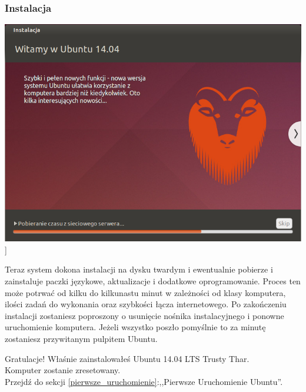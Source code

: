 \subsubsection{Instalacja}
\begin{center}
        \includegraphics[width=\linewidth]{images/instalator_kopiowanie.png}]
\end{center}

Teraz system dokona instalacji na dysku twardym i ewentualnie pobierze i zainstaluje paczki językowe, aktualizacje i dodatkowe oprogramowanie. Proces ten może potrwać od kilku do kilkunastu minut w zależności od klasy komputera, ilości zadań do wykonania oraz szybkości łącza internetowego.
Po zakończeniu instalacji zostaniesz poproszony o usunięcie nośnika instalacyjnego i ponowne uruchomienie komputera. Jeżeli wszystko poszło pomyślnie to za minutę zostaniesz przywitanym pulpitem Ubuntu.
\begin{flushright}
\textcolor{ubuntu_orange}{Gratulacje!} Właśnie zainstalowałeś Ubuntu 14.04 LTS Trusty Thar.\\
Komputer zostanie zresetowany.\\
Przejdź do sekcji \ref{pierwsze_uruchomienie}:,,Pierwsze Uruchomienie Ubuntu''.
\end{flushright}
\clearpage
